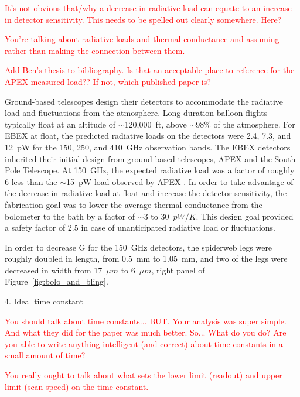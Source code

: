 \textcolor{red}{It's not obvious that/why a decrease in radiative load can equate to an increase in detector sensitivity. This needs to be spelled out clearly somewhere. Here?}

\textcolor{red}{You're talking about radiative loads and thermal conductance and assuming rather than making the connection between them.}

\textcolor{red}{Add Ben's thesis to bibliography. Is that an acceptable place to reference for the APEX measured load?? If not, which published paper is?}

Ground-based telescopes design their detectors to accommodate the radiative load and fluctuations from the atmosphere. 
Long-duration balloon flights typically float at an altitude of $\sim$120,000~ft, above $\sim$98\% of the atmosphere. 
For \ac{EBEX} at float, the predicted radiative loads on the detectors were 2.4, 7.3, and 12~pW for the 150, 250, and 410~GHz observation bands. 
The \ac{EBEX} detectors inherited their initial design from ground-based telescopes, \ac{APEX} and the South Pole Telescope. 
At 150~GHz, the expected radiative load was a factor of roughly 6 less than the $\sim$15~pW load observed by \ac{APEX} \cite{westbrook_thesis}. 
In order to take advantage of the decrease in radiative load at float and increase the detector sensitivity, the fabrication goal was to lower the average thermal conductance from the bolometer to the bath by a factor of $\sim$3 to 30~$pW/K$. 
This design goal provided a safety factor of 2.5 in case of unanticipated radiative load or fluctuations.

In order to decrease G for the 150~GHz detectors, the spiderweb legs were roughly doubled in length, from 0.5~mm to 1.05~mm, and two of the legs were decreased in width from 17~$\mu m$ to 6~$\mu m$, right panel of Figure~\ref{fig:bolo_and_bling}. 



4. Ideal time constant

\textcolor{red}{You should talk about time constants... BUT. Your analysis was super simple. And what they did for the paper was much better. So... What do you do? Are you able to write anything intelligent (and correct) about time constants in a small amount of time?}

\textcolor{red}{You really ought to talk about what sets the lower limit (readout) and upper limit (scan speed) on the time constant.}

